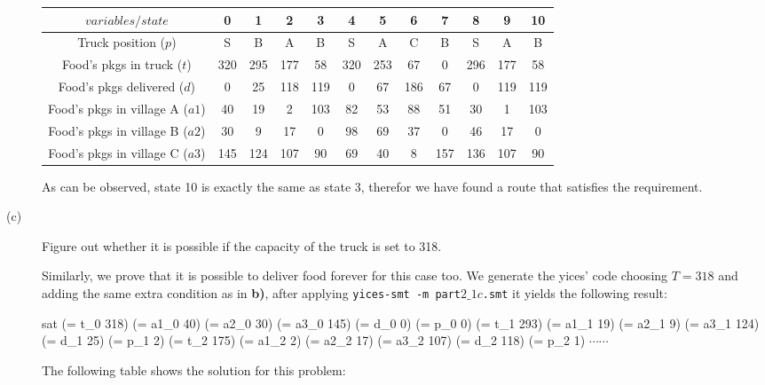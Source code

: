 \documentclass[a4paper]{article}
\begin{document}
\begin{description}
  \begin{center}
\begin{tabular}{|c|c|c|c|c|c|c|c|c|c|c|c|}
  \hline
  $variables/state$ & 0 & 1 & 2 & 3 & 4 & 5 & 6 & 7 & 8 & 9 & 10  \\
  \hline
  Truck position ($p$) & S & B & A & B & S & A & C & B & S & A & B\\
  Food's pkgs in truck ($t$) & 320 & 295 & 177 & 58 & 320 & 253 & 67 & 0 & 296 & 177 & 58\\
  Food's pkgs delivered ($d$) & 0 & 25 & 118 & 119 & 0 & 67 & 186 & 67 & 0 & 119 & 119\\
  Food's pkgs in village A ($a1$) & 40  & 19  & 2   & 103 & 82 & 53 & 88 & 51  & 30  & 1   & 103 \\
  Food's pkgs in village B ($a2$) & 30  & 9   & 17  & 0   & 98 & 69 & 37 & 0   & 46  & 17  & 0  \\
  Food's pkgs in village C ($a3$) & 145 & 124 & 107 & 90  & 69 & 40 & 8  & 157 & 136 & 107 & 90  \\
  \hline
\end{tabular}
\end{center}

  As can be observed, state 10 is exactly the same as state 3, therefor we have found a route that satisfies the requirement. 

  \item[(c)]  Figure out whether it is possible if the capacity of the truck is set to 318.

  Similarly, we prove that it is possible to deliver food forever for this case too. We generate the yices' code choosing $T = 318$ and adding the same extra condition as in \textbf{b)}, after applying {\tt yices-smt -m part$2\_1c$.smt} it yields the following result:
  
    \selectfont
  {\footnotesize
  \noindent

sat\break
(= t\_0 318)\break
(= a1\_0 40)\break
(= a2\_0 30)\break
(= a3\_0 145)\break
(= d\_0 0)\break
(= p\_0 0)\break
(= t\_1 293)\break
(= a1\_1 19)\break
(= a2\_1 9)\break
(= a3\_1 124)\break
(= d\_1 25)\break
(= p\_1 2)\break
(= t\_2 175)\break
(= a1\_2 2)\break
(= a2\_2 17)\break
(= a3\_2 107)\break
(= d\_2 118)\break
(= p\_2 1)\break
$\cdots \cdots$
  }
  \selectfont
  \vspace{3mm}
  
  The following table shows the solution for this problem:
  

\end{description}
\end{document}
